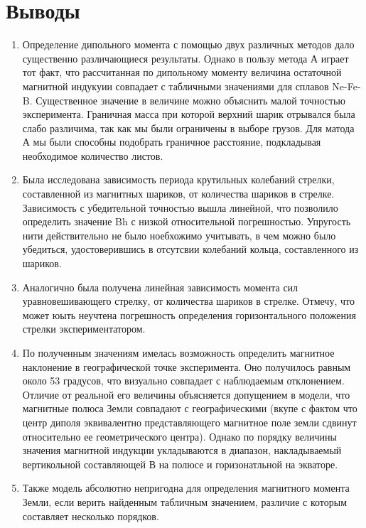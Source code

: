 \documentclass[a4paper, 12pt]{article}
\begin{document}
 \section{Выводы}
\begin{enumerate}
    \item Определение дипольного момента с помощью двух различных методов дало существенно различающиеся результаты. Однако в пользу метода А играет тот факт, что рассчитанная по дипольному моменту величина остаточной магнитной индукуии совпадает с табличными значениями для сплавов Ne-Fe-B. Существенное значение в величине можно объяснить малой точностью эксперимента. Граничная масса при которой верхний шарик отрывался была слабо различима, так как мы были ограничены в выборе грузов. Для матода А мы были способны подобрать граничное расстояние, подкладывая необходимое количество листов.
    \item Была исследована зависимость периода крутильных колебаний стрелки, составленной из магнитных шариков, от количества шариков в стрелке. Зависимость с убедительной точностью вышла линейной, что позволило определить значение Bh с низкой относительной погрешностью. Упругость нити действительно не было ноебхожимо учитывать, в чем можно было убедиться, удостоверившись в отсутсвии колебаний кольца, составленного из шариков.
    \item Аналогично была получена линейная зависимость момента сил уравновешивающего стрелку, от количества шариков в стрелке. Отмечу, что может юыть неучтена погрешность определения горизонтального положения стрелки экспериментатором.
    \item По полученным значениям имелась возможность определить магнитное наклонение в географической точке эксперимента. Оно получилось равным около 53 градусов, что визуально совпадает с наблюдаемым отклонением. Отличие от реальной его величины объясняется допущением в модели, что магнитные полюса Земли совпадают с географическими (вкупе с фактом что центр диполя эквивалентно представляющего магнитное поле земли сдвинут относительно ее геометрического центра). Однако по порядку величины значения магнитной индукции укладываются в диапазон, накладываемый вертикольной составляющей В на полюсе и горизонатльной на экваторе.
    \item Также модель абсолютно непригодна для определения магнитного момента Земли, если верить найденным табличным значением, различие с которым составляет несколько порядков.

\end{enumerate}
\end{document}
